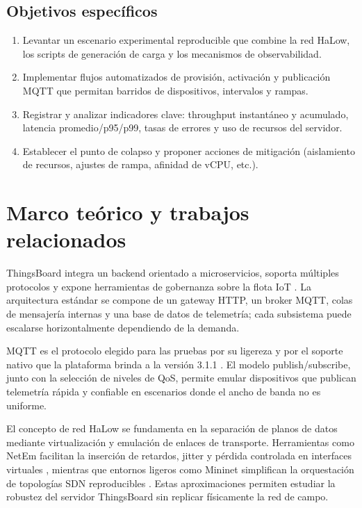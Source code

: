 ﻿\documentclass[conference]{IEEEtran}
\begin{document}
\subsection{Objetivos espec\'ificos}
\begin{enumerate}
  \item Levantar un escenario experimental reproducible que combine la red HaLow, los scripts de generaci\'on de carga y los mecanismos de observabilidad.
  \item Implementar flujos automatizados de provisi\'on, activaci\'on y publicaci\'on MQTT que permitan barridos de dispositivos, intervalos y rampas.
  \item Registrar y analizar indicadores clave: throughput instant\'aneo y acumulado, latencia promedio/p95/p99, tasas de errores y uso de recursos del servidor.
  \item Establecer el punto de colapso y proponer acciones de mitigaci\'on (aislamiento de recursos, ajustes de rampa, afinidad de vCPU, etc.).
\end{enumerate}

\section{Marco te\'orico y trabajos relacionados}
ThingsBoard integra un backend orientado a microservicios, soporta m\'ultiples protocolos y expone herramientas de gobernanza sobre la flota IoT \cite{thingsboard-docs}. La arquitectura est\'andar se compone de un gateway HTTP, un broker MQTT, colas de mensajer\'ia internas y una base de datos de telemetr\'ia; cada subsistema puede escalarse horizontalmente dependiendo de la demanda.

MQTT es el protocolo elegido para las pruebas por su ligereza y por el soporte nativo que la plataforma brinda a la versi\'on 3.1.1 \cite{oasis-mqtt311}. El modelo publish/subscribe, junto con la selecci\'on de niveles de QoS, permite emular dispositivos que publican telemetr\'ia r\'apida y confiable en escenarios donde el ancho de banda no es uniforme.

El concepto de red HaLow se fundamenta en la separaci\'on de planos de datos mediante virtualizaci\'on y emulaci\'on de enlaces de transporte. Herramientas como NetEm facilitan la inserci\'on de retardos, jitter y p\'erdida controlada en interfaces virtuales \cite{hemminger2005netem}, mientras que entornos ligeros como Mininet simplifican la orquestaci\'on de topolog\'ias SDN reproducibles \cite{lantz2010network}. Estas aproximaciones permiten estudiar la robustez del servidor ThingsBoard sin replicar f\'isicamente la red de campo.
\end{document}
